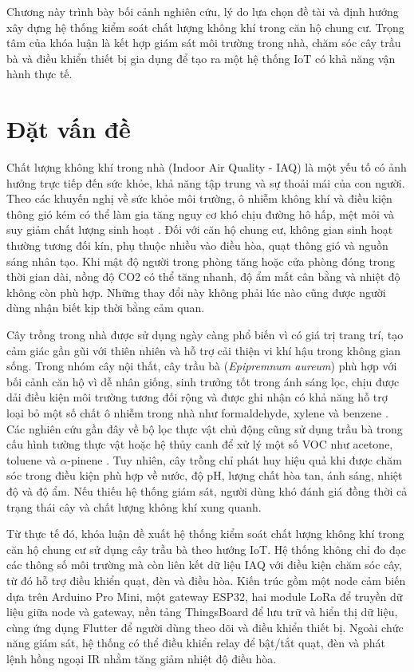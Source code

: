 Chương này trình bày bối cảnh nghiên cứu, lý do lựa chọn đề tài và định hướng xây dựng hệ thống kiểm soát chất lượng không khí trong căn hộ chung cư. Trọng tâm của khóa luận là kết hợp giám sát môi trường trong nhà, chăm sóc cây trầu bà và điều khiển thiết bị gia dụng để tạo ra một hệ thống IoT có khả năng vận hành thực tế.

\section{Đặt vấn đề}
Chất lượng không khí trong nhà (Indoor Air Quality - IAQ) là một yếu tố có ảnh hưởng trực tiếp đến sức khỏe, khả năng tập trung và sự thoải mái của con người. Theo các khuyến nghị về sức khỏe môi trường, ô nhiễm không khí và điều kiện thông gió kém có thể làm gia tăng nguy cơ khó chịu đường hô hấp, mệt mỏi và suy giảm chất lượng sinh hoạt \cite{who_air_pollution,epa_iaq}. Đối với căn hộ chung cư, không gian sinh hoạt thường tương đối kín, phụ thuộc nhiều vào điều hòa, quạt thông gió và nguồn sáng nhân tạo. Khi mật độ người trong phòng tăng hoặc cửa phòng đóng trong thời gian dài, nồng độ CO2 có thể tăng nhanh, độ ẩm mất cân bằng và nhiệt độ không còn phù hợp. Những thay đổi này không phải lúc nào cũng được người dùng nhận biết kịp thời bằng cảm quan.

Cây trồng trong nhà được sử dụng ngày càng phổ biến vì có giá trị trang trí, tạo cảm giác gần gũi với thiên nhiên và hỗ trợ cải thiện vi khí hậu trong không gian sống. Trong nhóm cây nội thất, cây trầu bà (\textit{Epipremnum aureum}) phù hợp với bối cảnh căn hộ vì dễ nhân giống, sinh trưởng tốt trong ánh sáng lọc, chịu được dải điều kiện môi trường tương đối rộng và được ghi nhận có khả năng hỗ trợ loại bỏ một số chất ô nhiễm trong nhà như formaldehyde, xylene và benzene \cite{pothos_wisconsin}. Các nghiên cứu gần đây về bộ lọc thực vật chủ động cũng sử dụng trầu bà trong cấu hình tường thực vật hoặc hệ thủy canh để xử lý một số VOC như acetone, toluene và $\alpha$-pinene \cite{montaluisa_pothos_biofilter}. Tuy nhiên, cây trồng chỉ phát huy hiệu quả khi được chăm sóc trong điều kiện phù hợp về nước, độ pH, lượng chất hòa tan, ánh sáng, nhiệt độ và độ ẩm. Nếu thiếu hệ thống giám sát, người dùng khó đánh giá đồng thời cả trạng thái cây và chất lượng không khí xung quanh.

Từ thực tế đó, khóa luận đề xuất hệ thống kiểm soát chất lượng không khí trong căn hộ chung cư sử dụng cây trầu bà theo hướng IoT. Hệ thống không chỉ đo đạc các thông số môi trường mà còn liên kết dữ liệu IAQ với điều kiện chăm sóc cây, từ đó hỗ trợ điều khiển quạt, đèn và điều hòa. Kiến trúc gồm một node cảm biến dựa trên Arduino Pro Mini, một gateway ESP32, hai module LoRa để truyền dữ liệu giữa node và gateway, nền tảng ThingsBoard để lưu trữ và hiển thị dữ liệu, cùng ứng dụng Flutter để người dùng theo dõi và điều khiển thiết bị. Ngoài chức năng giám sát, hệ thống có thể điều khiển relay để bật/tắt quạt, đèn và phát lệnh hồng ngoại IR nhằm tăng giảm nhiệt độ điều hòa.
